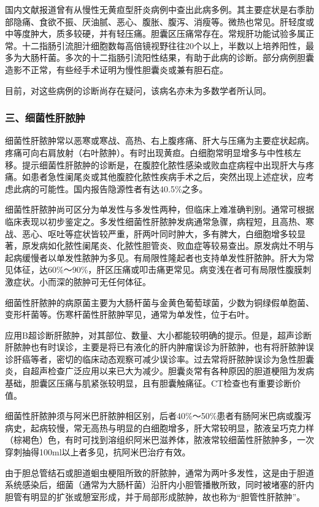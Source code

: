 国内文献报道曾有从慢性无黄疸型肝炎病例中查出此病多例。其主要症状是右季肋部隐痛、食欲不振、厌油腻、恶心、腹胀、腹泻、消瘦等。微热也常见。肝轻度或中等度肿大，质多较硬，并有轻压痛。胆囊区压痛常存在。常规肝功能试验多属正常。十二指肠引流胆汁细胞数每高倍镜视野往往20个以上，半数以上培养阳性，最多为大肠杆菌。多次的十二指肠引流阳性结果，有助于此病的诊断。部分病例胆囊造影不正常，有些经手术证明为慢性胆囊炎或兼有胆石症。

目前，对这些病例的诊断尚存在疑问，该病名亦未为多数学者所认同。

\subsubsection{三、细菌性肝脓肿}

细菌性肝脓肿常以恶寒或寒战、高热、右上腹疼痛、肝大与压痛为主要症状起病。疼痛可向右肩放射（右叶脓肿）。有时出现黄疸。白细胞常明显增多与中性核左移。提示细菌性肝脓肿的诊断是，在腹腔化脓性感染或败血症病程中出现肝大与疼痛。如患者急性阑尾炎或其他腹腔化脓性疾病手术之后，突然出现上述症状，应考虑此病的可能性。国内报告隐源性者有达40.5\%之多。

细菌性肝脓肿尚可区分为单发性与多发性两种，但临床上难准确判别。通常可根据临床表现以初步鉴定之。多发性细菌性肝脓肿发病通常急骤，病程短，且高热、寒战、恶心、呕吐等症状皆较严重，肝两叶同时肿大，多有脾大，白细胞增多较显著，原发病如化脓性阑尾炎、化脓性胆管炎、败血症等较易查出。原发病灶不明与起病缓慢者以单发性脓肿为多见。有局限性隆起者也支持单发性肝脓肿。肝大为常见体征，达60\%～90\%，肝区压痛或叩击痛更常见。病变浅在者可有局限性腹膜刺激症状。小而深的脓肿可无任何体征。

细菌性肝脓肿的病原菌主要为大肠杆菌与金黄色葡萄球菌，少数为铜绿假单胞菌、变形杆菌等。伤寒杆菌性肝脓肿罕见，通常为单发性，位于右叶。

应用B超诊断肝脓肿，对其部位、数量、大小都能较明确的提示。但是，超声诊断肝脓肿也有时误诊，主要是将已有液化的肝内肿瘤误诊为肝脓肿，也有将肝脓肿误诊肝癌等者，密切的临床动态观察可减少误诊率。过去常将肝脓肿误诊为急性胆囊炎，自超声检查广泛应用以来已大为减少。胆囊炎常有各种原因的胆道梗阻为发病基础，胆囊区压痛与肌紧张较明显，且有胆囊触痛征。CT检查也有重要诊断价值。

细菌性肝脓肿须与阿米巴肝脓肿相区别，后者40\%～50\%患者有肠阿米巴病或腹泻病史，起病较慢，常无高热与明显的白细胞增多，肝大常较明显，脓液呈巧克力样（棕褐色）色，有时可找到溶组织阿米巴滋养体，脓液常较细菌性肝脓肿多，一次穿刺抽得100ml以上者多见，抗阿米巴治疗有效。

由于胆总管结石或胆道蛔虫梗阻所致的肝脓肿，通常为两叶多发性，这是由于胆道系统感染后，细菌（通常为大肠杆菌）沿肝内小胆管播散所致，同时被堵塞的肝内胆管有明显的扩张或憩室形成，并于局部形成脓肿，故也称为“胆管性肝脓肿”。

